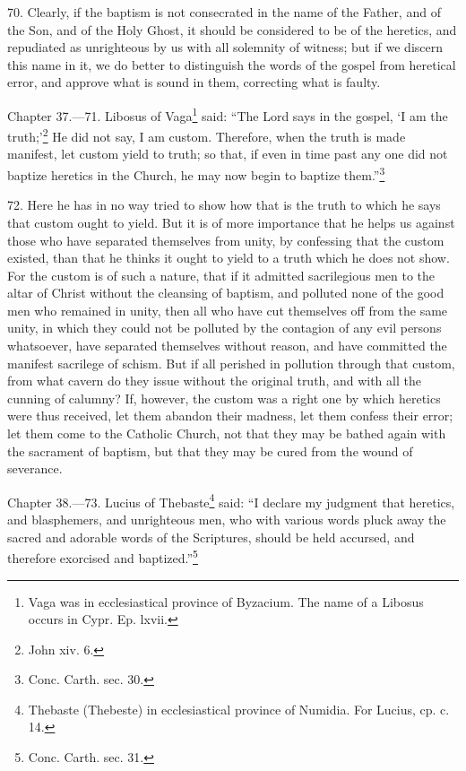70. Clearly, if the baptism is not consecrated in the name of the Father, and of the Son, and of the Holy Ghost, it should be considered to be of the heretics, and repudiated as unrighteous by us with all solemnity of witness; but if we discern this name in it, we do better to distinguish the words of the gospel from heretical error, and approve what is sound in them, correcting what is faulty.


Chapter 37.—71. Libosus of Vaga\footnote{\par  Vaga was in ecclesiastical province of Byzacium. The name of a Libosus occurs in Cypr. Ep. lxvii.} said: ``The Lord says in the gospel, ‘I am the truth;’\footnote{\par  John xiv. 6.} He did not say, I am custom. Therefore, when the truth is made manifest, let custom yield to truth; so that, if even in time past any one did not baptize heretics in the Church, he may now begin to baptize them.''\footnote{\par  Conc. Carth. sec. 30.}

72. Here he has in no way tried to show how that is the truth to which he says that custom ought to yield. But it is of more importance that he helps us against those who have separated themselves from unity, by confessing that the custom existed, than that he thinks it ought to yield to a truth which he does not show. For the custom is of such a nature, that if it admitted sacrilegious men to the altar of Christ without the cleansing of baptism, and polluted none of the good men who remained in unity, then all who have cut themselves off from the same unity, in which they could not be polluted by the contagion of any evil persons whatsoever, have separated themselves without reason, and have committed the manifest sacrilege of schism. But if all perished in pollution through that custom, from what cavern do they issue without the original truth, and with all the cunning of calumny? If, however, the custom was a right one by which heretics were thus received, let them abandon their madness, let them confess their error; let them come to the Catholic Church, not that they may be bathed again with the sacrament of baptism, but that they may be cured from the wound of severance.


Chapter 38.—73. Lucius of Thebaste\footnote{\par  Thebaste (Thebeste) in ecclesiastical province of Numidia. For Lucius, cp. c. 14.} said: ``I declare my judgment that heretics, and blasphemers, and unrighteous men, who with various words pluck away the sacred and adorable words of the Scriptures, should be held accursed, and therefore exorcised and baptized.''\footnote{\par  Conc. Carth. sec. 31.}

